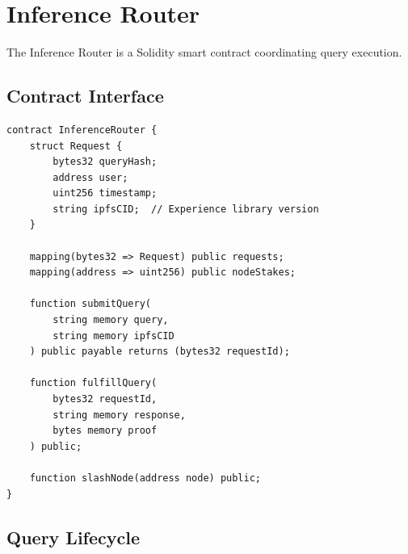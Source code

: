 \section{Inference Router}


The Inference Router is a Solidity smart contract coordinating query execution.

\subsection{Contract Interface}

\begin{verbatim}
contract InferenceRouter {
    struct Request {
        bytes32 queryHash;
        address user;
        uint256 timestamp;
        string ipfsCID;  // Experience library version
    }

    mapping(bytes32 => Request) public requests;
    mapping(address => uint256) public nodeStakes;

    function submitQuery(
        string memory query,
        string memory ipfsCID
    ) public payable returns (bytes32 requestId);

    function fulfillQuery(
        bytes32 requestId,
        string memory response,
        bytes memory proof
    ) public;

    function slashNode(address node) public;
}
\end{verbatim}

\subsection{Query Lifecycle}

